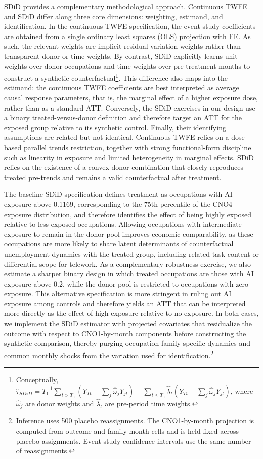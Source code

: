 SDiD provides a complementary methodological approach. Continuous TWFE and SDiD differ along three core dimensions: weighting, estimand, and identification. In the continuous TWFE specification, the event-study coefficients are obtained from a single ordinary least squares (OLS) projection with FE. As such, the relevant weights are implicit residual-variation weights rather than transparent donor or time weights. By contrast, SDiD explicitly learns unit weights over donor occupations and time weights over pre-treatment months to construct a synthetic counterfactual\footnote{Conceptually, \(\widehat{\tau}_{SDiD}=T_1^{-1}\sum_{t>T_0}\left(\overline{Y}_{Tt}-\sum_j\widehat{\omega}_jY_{jt}\right)-\sum_{t\leq T_0}\widehat{\lambda}_t\left(\overline{Y}_{Tt}-\sum_j\widehat{\omega}_jY_{jt}\right)\), where \(\widehat{\omega}_j\) are donor weights and \(\widehat{\lambda}_t\) are pre-period time weights.}. This difference also maps into the estimand: the continuous TWFE coefficients are best interpreted as average causal response parameters, that is, the marginal effect of a higher exposure dose, rather than as a standard ATT. Conversely, the SDiD exercises in our design use a binary treated-versus-donor definition and therefore target an ATT for the exposed group relative to its synthetic control. Finally, their identifying assumptions are related but not identical. Continuous TWFE relies on a dose-based parallel trends restriction, together with strong functional-form discipline such as linearity in exposure and limited heterogeneity in marginal effects. SDiD relies on the existence of a convex donor combination that closely reproduces treated pre-trends and remains a valid counterfactual after treatment.

The baseline SDiD specification defines treatment as occupations with AI exposure above 0.1169, corresponding to the 75th percentile of the CNO4 exposure distribution, and therefore identifies the effect of being highly exposed relative to less exposed occupations. Allowing occupations with intermediate exposure to remain in the donor pool improves economic comparability, as these occupations are more likely to share latent determinants of counterfactual unemployment dynamics with the treated group, including related task content or differential scope for telework. As a complementary robustness exercise, we also estimate a sharper binary design in which treated occupations are those with AI exposure above 0.2, while the donor pool is restricted to occupations with zero exposure. This alternative specification is more stringent in ruling out AI exposure among controls and therefore yields an ATT that can be interpreted more directly as the effect of high exposure relative to no exposure. In both cases, we implement the SDiD estimator with projected covariates that residualize the outcome with respect to CNO1-by-month components before constructing the synthetic comparison, thereby purging occupation-family-specific dynamics and common monthly shocks from the variation used for identification.\footnote{Inference uses 500 placebo reassignments. The CNO1-by-month projection is computed from outcome and family-month cells and is held fixed across placebo assignments. Event-study confidence intervals use the same number of reassignments.}

